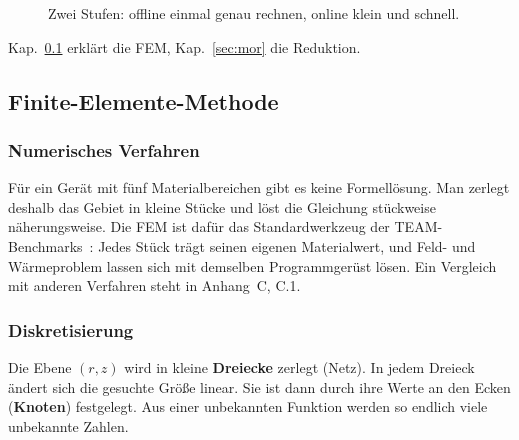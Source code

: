 \documentclass[a4paper, 10pt, conference]{ieeeconf}
\begin{document}
\begin{figure}[t]
\centering
{}
\caption{Zwei Stufen: offline einmal genau rechnen, online klein und schnell.}
\label{fig:stages}
\end{figure}

Kap.~\ref{sec:fem} erklärt die FEM, Kap.~\ref{sec:mor} die Reduktion.

\subsection{Finite-Elemente-Methode}
\label{sec:fem}

\subsubsection{Numerisches Verfahren}
Für ein Gerät mit fünf Materialbereichen gibt es keine Formellösung. Man
zerlegt deshalb das Gebiet in kleine Stücke und löst die Gleichung
stückweise näherungsweise. Die FEM ist dafür das Standardwerkzeug der
TEAM-Benchmarks~\cite{team28,biro1989vectorpotential}: Jedes Stück trägt
seinen eigenen Materialwert, und Feld- und Wärmeproblem lassen sich mit
demselben Programmgerüst lösen. Ein Vergleich mit anderen Verfahren steht in
Anhang~C, C.1.

\subsubsection{Diskretisierung}
Die Ebene $(r,z)$ wird in kleine \textbf{Dreiecke} zerlegt (Netz). In jedem
Dreieck ändert sich die gesuchte Größe linear. Sie ist dann durch ihre Werte
an den Ecken (\textbf{Knoten}) festgelegt. Aus einer unbekannten Funktion
werden so endlich viele unbekannte Zahlen.
\end{document}
